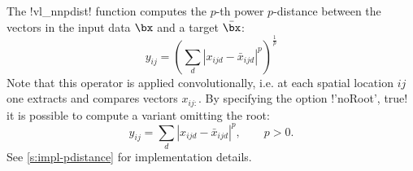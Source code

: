 The !vl_nnpdist! function computes the $p$-th power $p$-distance between the vectors in the input data $\bx$ and a target $\bar\bx$:
\[
  y_{ij} = \left(\sum_d |x_{ijd} - \bar x_{ijd}|^p\right)^\frac{1}{p}
\]
Note that this operator is applied convolutionally, i.e. at each spatial location $ij$ one extracts and compares vectors $x_{ij:}$. By specifying the option !'noRoot', true! it is possible to compute a variant omitting the root:
\[
  y_{ij} = \sum_d |x_{ijd} - \bar x_{ijd}|^p, \qquad p > 0.
\]
See \autoref{s:impl-pdistance} for implementation details.

%
%
%
%
%
%
